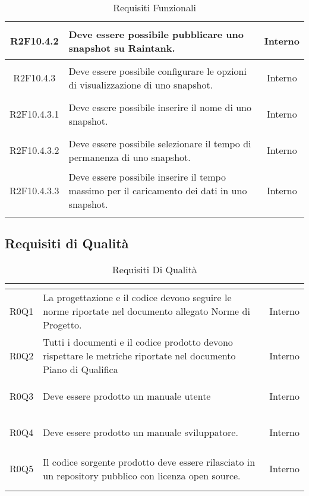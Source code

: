\begin{longtable}{|c|H|c|}
	\hypertarget{R2F10.4.2}{R2F10.4.2} & Deve essere possibile pubblicare uno snapshot su Raintank. & Interno \\ \hline 
	\hypertarget{R2F10.4.3}{R2F10.4.3} & Deve essere possibile configurare le opzioni di visualizzazione di uno snapshot. & Interno \\ \hline 
	\hypertarget{R2F10.4.3.1}{R2F10.4.3.1} & Deve essere possibile inserire il nome di uno snapshot. & Interno \\ \hline 
	\hypertarget{R2F10.4.3.2}{R2F10.4.3.2} & Deve essere possibile selezionare il tempo di permanenza di uno snapshot. & Interno \\ \hline 
	\hypertarget{R2F10.4.3.3}{R2F10.4.3.3} & Deve essere possibile inserire il tempo massimo per il caricamento dei dati in uno snapshot. & Interno \\ \hline 
	
	\caption[Requisiti Funzionali]{Requisiti Funzionali}
	\label{tabella:req0}
\end{longtable}
\renewcommand{\arraystretch}{1}
\clearpage
{}
\subsection{Requisiti di Qualità}
\normalsize
\renewcommand{\arraystretch}{1.5}
\begin{longtable}{|c|H|c|}
	\hline
	\textbf{\color{title_text}{Id Requisito}} & \textbf{\color{title_text}{Descrizione}} & \textbf{\color{title_text}{Fonte}}\\
	\hline
	\endhead
	\hypertarget{R0Q1}{R0Q1} & La progettazione e il codice devono seguire le norme riportate nel documento allegato Norme di Progetto. & Interno \\ \hline 
	\hypertarget{R0Q2}{R0Q2} & Tutti i documenti e il codice prodotto devono rispettare le metriche riportate nel documento Piano di Qualifica & Interno \\ \hline 
	\hypertarget{R0Q3}{R0Q3} & Deve essere prodotto un manuale utente & Interno \\ \hline 
	\hypertarget{R0Q4}{R0Q4} & Deve essere prodotto un manuale sviluppatore. & Interno \\ \hline 
	\hypertarget{R0Q5}{R0Q5} & Il codice sorgente prodotto deve essere rilasciato in un repository pubblico con licenza open source. & Interno  \\ \hline
	\caption[Requisiti di Qualità]{Requisiti Di Qualità}
	\label{tabella:req1}
\end{longtable}
\renewcommand{\arraystretch}{1}
\clearpage
{}
